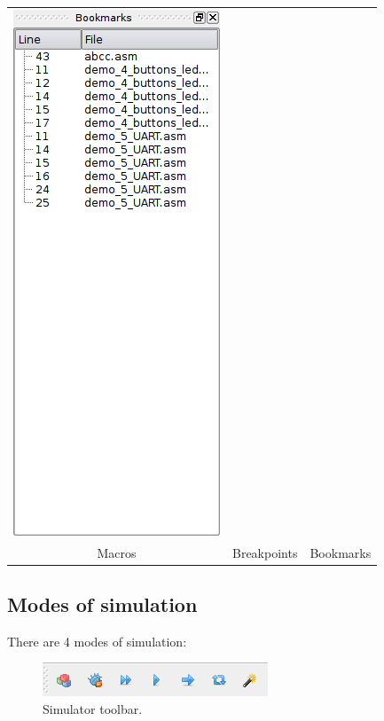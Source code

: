 \begin{table}[h!]
\begin{tabular}{ccc}
            \includegraphics[width=.3\textwidth]{img/NewImg/listbookmarks.png}
            \\
            Macros & Breakpoints & Bookmarks
        \end{tabular}
    \end{table}

    
    \subsection{Modes of simulation}
        There are 4 modes of simulation:

        \begin{figure}[h!]
            \centering{}
            \includegraphics[width=.4\textwidth]{img/simulation_panel.png}
            \caption{Simulator toolbar.}
        \end{figure}

